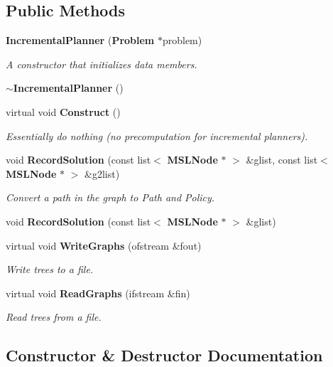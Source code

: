 \subsection*{Public Methods}
\begin{CompactItemize}
\item 
{\bf Incremental\-Planner} ({\bf Problem} $\ast$problem)
\begin{CompactList}\small\item\em A constructor that initializes data members.\item\end{CompactList}\item 
{\bf $\sim$Incremental\-Planner} ()
\item 
virtual void {\bf Construct} ()
\begin{CompactList}\small\item\em Essentially do nothing (no precomputation for incremental planners).\item\end{CompactList}\item 
void {\bf Record\-Solution} (const list$<$ {\bf MSLNode} $\ast$ $>$ \&glist, const list$<$ {\bf MSLNode} $\ast$ $>$ \&g2list)
\begin{CompactList}\small\item\em Convert a path in the graph to Path and Policy.\item\end{CompactList}\item 
void {\bf Record\-Solution} (const list$<$ {\bf MSLNode} $\ast$ $>$ \&glist)
\item 
virtual void {\bf Write\-Graphs} (ofstream \&fout)
\begin{CompactList}\small\item\em Write trees to a file.\item\end{CompactList}\item 
virtual void {\bf Read\-Graphs} (ifstream \&fin)
\begin{CompactList}\small\item\em Read trees from a file.\item\end{CompactList}\end{CompactItemize}


\subsection{Constructor \& Destructor Documentation}
